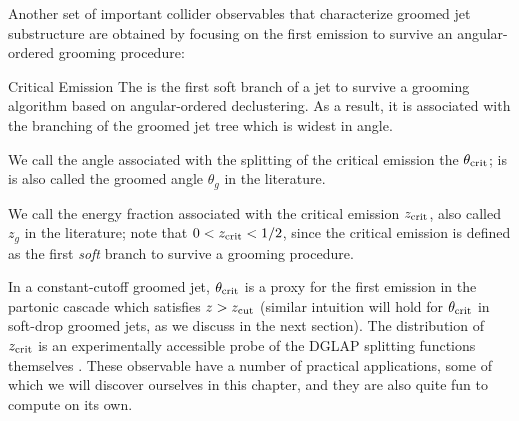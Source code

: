 Another set of important collider observables that characterize groomed jet substructure are obtained by focusing on the first emission to survive an angular-ordered grooming procedure:

\begin{definitionbox}{Critical Emission}{}
    The  is the first soft branch of a jet to survive a grooming algorithm based on angular-ordered \gls{declustering}.
    As a result, it is associated with the branching of the groomed jet tree which is widest in angle.

    We call the angle associated with the splitting of the critical emission the  \(\theta_{\rm crit}\);
    is is also called the groomed angle \(\theta_g\) in the literature.

    We call the energy fraction associated with the critical emission \(z_{\rm crit}\), also called \(z_g\) in the literature;
    note that \(0 < z_{\rm crit} < 1/2\), since the critical emission is defined as the first \textit{soft} branch to survive a grooming procedure.
\end{definitionbox}


In a constant-cutoff groomed jet, \(\theta_{\rm crit}\) is a proxy for the first emission in the partonic cascade which satisfies \(z > z_{\rm cut}\) (similar intuition will hold for \(\theta_{\rm crit}\) in \gls{soft-drop} groomed jets, as we discuss in the next section).
%
The distribution of \(z_{\rm crit}\) is an experimentally accessible probe of the DGLAP splitting functions themselves \cite{Larkoski:2015lea,ALargeIonColliderExperiment:2021mqf}.
%
These observable have a number of practical applications, some of which we will discover ourselves in this chapter, and they are also quite fun to compute on its own.

